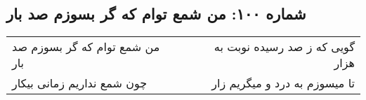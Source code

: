 \begin{center}
\section*{شماره ۱۰۰: من شمع توام که گر بسوزم صد بار}
\label{sec:100}
\begin{longtable}{l p{0.5cm} r}
من شمع توام که گر بسوزم صد بار
&&
گویی که ز صد رسیده نوبت به هزار
\\
چون شمع نداریم زمانی بیکار
&&
تا میسوزم به درد و میگریم زار
\\
\end{longtable}
\end{center}
